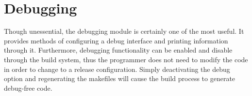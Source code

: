 \section{Debugging}

Though unessential, the debugging module is certainly one of the most useful.
It provides methods of configuring a debug interface and printing information
through it. Furthermore, debugging functionality can be enabled and disable
through the build system, thus the programmer does not need to modify the code
in order to change to a release configuration. Simply deactivating the debug
option and regenerating the makefiles will cause the build process to generate
debug-free code.

